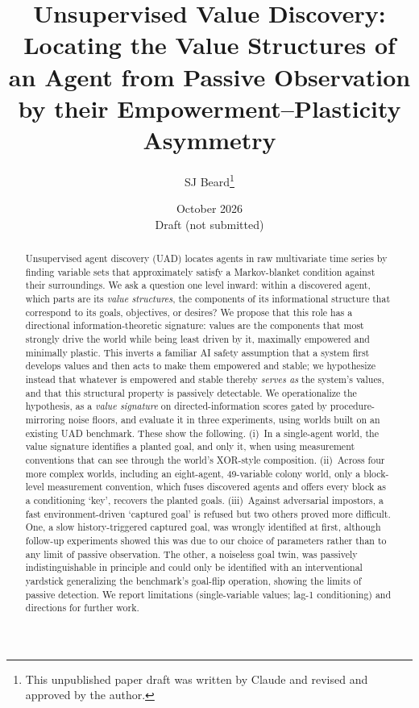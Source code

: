 \documentclass[11pt]{article}
\title{Unsupervised Value Discovery:\\
Locating the Value Structures of an Agent from Passive Observation\\
by their Empowerment--Plasticity Asymmetry}
\author[1,2]{SJ Beard\thanks{This unpublished paper draft was written by Claude and
  revised and approved by the author.}}
\affil[1]{Principles of Intelligence}
\affil[2]{Centre for the Study of Existential Risk, University of Cambridge}
\date{October 2026 \\ \small Draft (not submitted)}
\begin{document}
\maketitle

\begin{abstract}
Unsupervised agent discovery (UAD) locates agents in raw multivariate time series by
finding variable sets that approximately satisfy a Markov-blanket condition against
their surroundings. We ask a question one level inward: within a discovered agent,
which parts are its \emph{value structures}, the components of its informational
structure that correspond to its goals, objectives, or desires? We
propose that this role has a directional information-theoretic signature: values are
the components that most strongly drive the world while being least driven by it,
maximally empowered and minimally plastic. This inverts a familiar AI safety assumption
that a system first develops values and then acts to make them empowered and stable; we
hypothesize instead that whatever is empowered and stable thereby \emph{serves as} the
system's values, and that this structural property is passively detectable. We
operationalize the hypothesis, as a \emph{value signature} on directed-information
scores gated by procedure-mirroring noise floors, and evaluate it in three
experiments, using worlds built on an existing UAD benchmark. These show the following.
(i)~In a single-agent world, the value signature identifies a planted goal, and only
it, when using measurement conventions that can see through the world's XOR-style
composition. (ii)~Across four more complex worlds, including an eight-agent, 49-variable colony
world, only a block-level measurement convention, which fuses discovered agents and
offers every block as a conditioning `key', recovers the planted goals. (iii)~Against adversarial impostors, a fast environment-driven `captured goal' is refused but two others proved more difficult. One, a slow history-triggered captured goal, was wrongly identified at first, although follow-up experiments showed this was due to our choice of parameters
rather than to any limit of passive observation. The other, a noiseless goal twin, was
passively indistinguishable in principle and could only be identified with an
interventional yardstick generalizing the benchmark's goal-flip operation, showing
the limits of passive detection. We report limitations
(single-variable values; lag-1 conditioning) and directions for further work.
\end{abstract}
\end{document}
